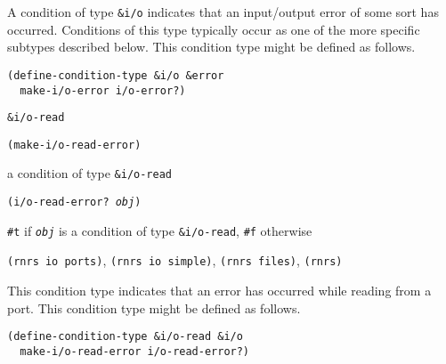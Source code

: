 A condition of type \texttt{\&{}i/o} indicates that an input/output error
of some sort has occurred.
Conditions of this type typically occur as one of the more
specific subtypes described below.
This condition type might be defined as follows.

\begin{alltt}
(define-condition-type \&{}i/o \&{}error
  make-i/o-error i/o-error?)
\end{alltt}

\begin{description}

\label{exceptions_s33}\item[syntax] \texttt{\&{}i/o-read}



\item[procedure] \texttt{(make-i/o-read-error)}



\item[returns] a condition of type \texttt{\&{}i/o-read}


\item[procedure] \texttt{(i/o-read-error? \textit{obj})}



\item[returns] \texttt{\#{}t} if \texttt{\textit{obj}} is a condition of type \texttt{\&{}i/o-read}, \texttt{\#{}f} otherwise


\item[libraries] \texttt{(rnrs io ports)}, \texttt{(rnrs io simple)}, \texttt{(rnrs files)}, \texttt{(rnrs)}
\end{description}



This condition type indicates that an error has occurred while reading
from a port.
This condition type might be defined as follows.

\begin{alltt}
(define-condition-type \&{}i/o-read \&{}i/o
  make-i/o-read-error i/o-read-error?)
\end{alltt}

